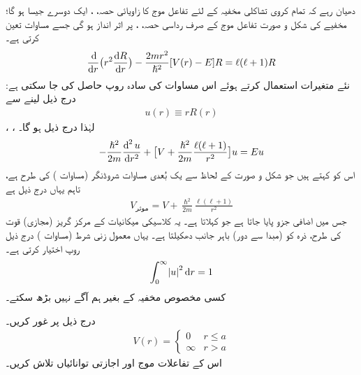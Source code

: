 دھیان رہے کہ تمام کروی تشاکلی مخفیہ کے لئے تفاعل موج کا زاویائی حصہ، ، ایک دوسرے جیسا ہو گا؛ مخفیے  کی شکل و صورت تفاعل موج کے صرف رداسی حصہ، ، پر اثر انداز ہو گی جسے مساوات  تعین کرتی ہے۔
\begin{align}
\frac{\dif}{\dif r}\big(r^{2}\frac{\dif R}{\dif r}\big)-\frac{2mr^{2}}{\hslash^{2}}[V(r)-E]R=\ell(\ell+1)R
\end{align}
نئے متغیرات استعمال کرتے ہوئے اس مساوات کی سادہ روپ حاصل کی جا سکتی ہے: درج ذیل لینے سے
\begin{align}\label{مساوات_ابعادی_نئے_متغیر_رداسی}
u(r)\equiv{rR(r)} 
\end{align} 
، ،  لہٰذا درج ذیل ہو گا۔
\begin{align}\label{مساوات_ابعادی_رداسی}
-\frac{\hslash^{2}}{2m}\frac{\dif^{\,2}u}{\dif r^{2}}+\big[V+\frac{\hslash^{2}}{2m}\frac{\ell(\ell+1)}{r^{2}}\big]u=Eu
\end{align}
اس کو  کہتے ہیں جو شکل و صورت کے لحاظ سے یک بُعدی مساوات شروڈنگر (مساوات ) کی طرح ہے، تاہم یہاں  درج ذیل ہے
\begin{align}\label{مساوات_تین_ابعادی_موثر_مخفیہ}
V_{\text{موثر}}=V+\frac{\hslash^{2}}{2m}\frac{\ell(\ell+1)}{r^{2}} 
\end{align}
 جس میں  اضافی جزو پایا جاتا ہے جو  کہلاتا ہے۔ یہ کلاسیکی میکانیات کے مرکز گریز (مجازی) قوت کی طرح، ذرہ کو (مبدا سے دور) باہر جانب دھکیلتا ہے۔ یہاں معمول زنی شرط (مساوات ) درج ذیل روپ اختیار کرتی ہے۔ 
\begin{align}
\int_{0}^{\infty}\abs{u}^{2}\dif r=1 
\end{align}
کسی مخصوص مخفیہ  کے بغیر ہم آگے نہیں بڑھ سکتے۔

درج ذیل  پر غور کریں۔
\begin{align}
V(r)=\begin{cases}
0&r\le {a}\\
\infty&r>a
\end{cases} 
\end{align}
اس کے تفاعلات موج اور اجازتی توانائیاں تلاش کریں۔

